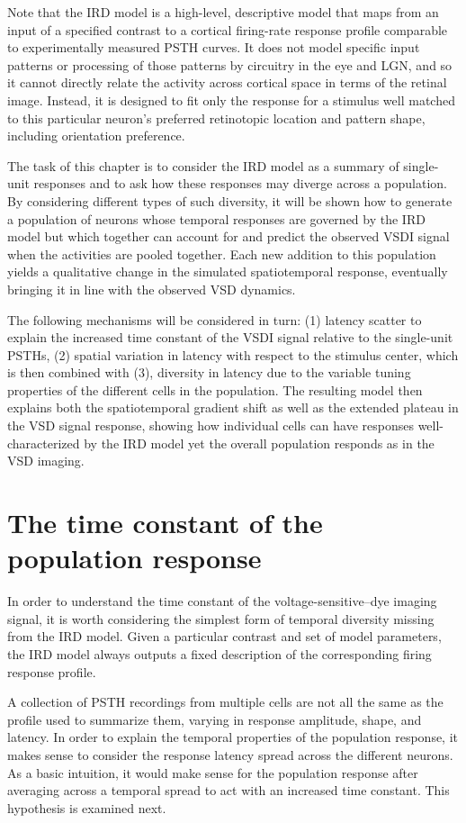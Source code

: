 \documentclass[phd,ianc,twoside]{infthesis}
\begin{document}
Note that the IRD model is a high-level, descriptive model that maps from an input
of a specified contrast to a cortical firing-rate response profile
comparable to experimentally measured PSTH curves. It does not model
specific input patterns or processing of those patterns by circuitry in
the eye and LGN, and so it cannot directly relate the activity across
cortical space in terms of the retinal image.  Instead, it is designed
to fit only the response for a stimulus well matched to this
particular neuron's preferred retinotopic location and pattern shape,
including orientation preference.

The task of this chapter is to consider the IRD model as a summary of
single-unit responses and to ask how these responses may diverge across
a population. By considering different types of such diversity, it will be
shown how to generate a population of neurons whose temporal responses
are governed by the IRD model but which together can account for and
predict the observed VSDI signal when the activities are pooled
together.  Each new addition to this population yields a qualitative
change in the simulated spatiotemporal response, eventually bringing it
in line with the observed VSD dynamics.

The following mechanisms will be considered in turn: (1) latency scatter
to explain the increased time constant of the VSDI signal relative to
the single-unit PSTHs, (2) spatial variation in latency with respect to
the stimulus center, which is then combined with (3), diversity in
latency due to the variable tuning properties of the different cells in
the population.  The resulting model then explains both the
spatiotemporal gradient shift as well as the extended plateau in the VSD
signal response, showing how individual cells can have responses
well-characterized by the IRD model yet the overall population responds
as in the VSD imaging.


\section{The time constant of the population response}

In order to understand the time constant of the voltage-sensitive--dye
imaging signal, it is worth considering the simplest form of temporal
diversity missing from the IRD model. Given a particular contrast and
set of model parameters, the IRD model always outputs a fixed
description of the corresponding firing response profile.

A collection of PSTH recordings from multiple cells are not all the same
as the profile used to summarize them, varying in response amplitude,
shape, and latency. In order to explain the temporal properties of the
population response, it makes sense to consider the response latency
spread across the different neurons. As a basic intuition, it would make
sense for the population response after averaging across a temporal
spread to act with an increased time constant. This hypothesis is
examined next.
\end{document}
